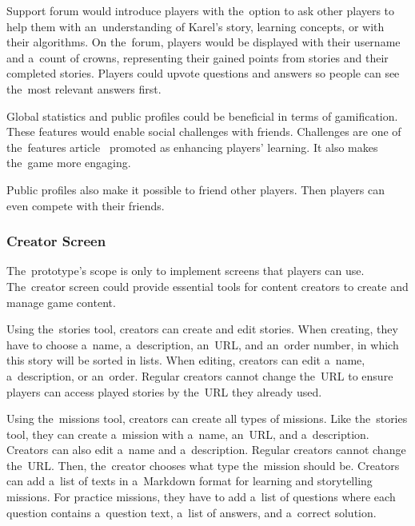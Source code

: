 Support forum would introduce players with the~option to ask other players to help them with an~understanding of Karel's story, learning concepts, or with their algorithms.
On the~forum, players would be displayed with their username and a~count of crowns, representing their gained points from stories and their completed stories.
Players could upvote questions and answers so people can see the~most relevant answers first.

Global statistics and public profiles could be beneficial in terms of gamification.
These features would enable social challenges with friends.
Challenges are one of the~features article~\cite{nand_2019_engaging} promoted as enhancing players' learning.
It also makes the~game more engaging.

Public profiles also make it possible to friend other players.
Then players can even compete with their friends.

\subsubsection{Creator Screen}

The~prototype's scope is only to implement screens that players can use.
The~creator screen could provide essential tools for content creators to create and manage game content.

Using the~stories tool, creators can create and edit stories.
When creating, they have to choose a~name, a~description, an~URL, and an~order number, in which this story will be sorted in lists.
When editing, creators can edit a~name, a~description, or an~order.
Regular creators cannot change the~URL to ensure players can access played stories by the~URL they already used.

Using the~missions tool, creators can create all types of missions.
Like the~stories tool, they can create a~mission with a~name, an~URL, and a~description.
Creators can also edit a~name and a~description.
Regular creators cannot change the~URL.
Then, the~creator chooses what type the~mission should be.
Creators can add a~list of texts in a~Markdown format for learning and storytelling missions.
For practice missions, they have to add a~list of questions where each question contains a~question text, a~list of answers, and a~correct solution.  

